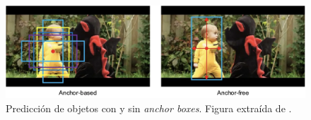 \begin{figure}[H]
    \centering
    \includegraphics[width=1\textwidth]{../img/anchorfree-vs-anchorbox.png}
    \caption{Predicción de objetos con y sin \textit{anchor boxes}. Figura extraída de \cite{SiameseAnchorFree}.}
    \label{fig:anchor-box-free}
\end{figure}
